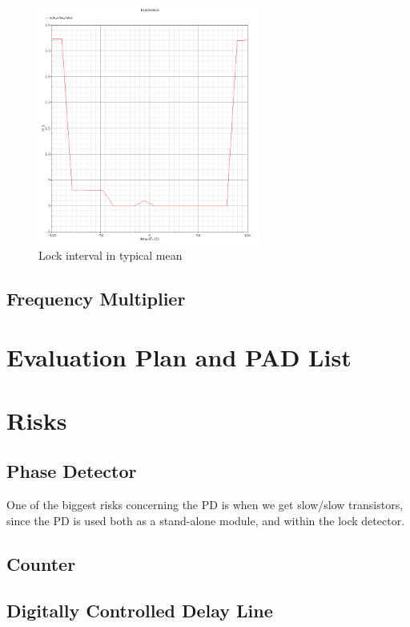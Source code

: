 \documentclass[a4paper,12pt]{article} \usepackage{graphicx}
\begin{document}
\begin{figure}[h]
  \centering
  \includegraphics[width=0.65\textwidth]{../Bilder/LD_tran/LD_lsim_tm.png}
  \caption{Lock interval in typical mean}
  \label{fig:LDtm}
\end{figure}

\clearpage

\subsection{Frequency Multiplier}

\section{Evaluation Plan and PAD List}

\section{Risks}
\subsection{Phase Detector}
One of the biggest risks concerning the PD is when we get
slow/slow transistors, since the PD is used both as a stand-alone
module, and within the lock detector.
\subsection{Counter}
\subsection{Digitally Controlled Delay Line}
\end{document}
